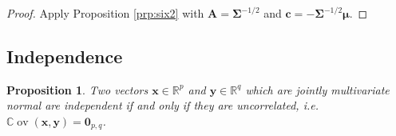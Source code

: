 \documentclass[
]{book}
\newtheorem{proposition}{Proposition}[chapter]
\theoremstyle{definition}
\theoremstyle{definition}
\theoremstyle{definition}
\theoremstyle{definition}
\theoremstyle{remark}
\begin{document}
\begin{proof}
Apply Proposition \ref{prp:six2} with \(\mathbf A= \boldsymbol{\Sigma}^{-1/2}\) and \(\mathbf c= - \boldsymbol{\Sigma}^{-1/2} {\boldsymbol{\mu}}\).
\end{proof}

\subsection{Independence}\label{independence}

\begin{proposition}
\protect\hypertarget{prp:six4}{}\label{prp:six4}Two vectors \(\mathbf x\in\mathbb{R}^p\) and \(\mathbf y\in\mathbb{R}^q\) which are jointly multivariate normal are independent if and only if they are uncorrelated, i.e.~\({\mathbb{C}\operatorname{ov}}(\mathbf x,\mathbf y) = {\boldsymbol 0}_{p,q}\).
\end{proposition}
\end{document}
